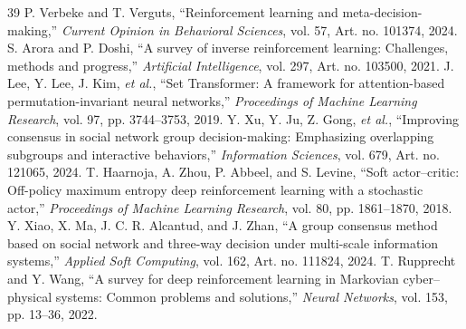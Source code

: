 \documentclass[journal]{IEEEtran}
\begin{document}
\begin{thebibliography}{39}
 P. Verbeke and T. Verguts, ``Reinforcement learning and meta-decision-making,'' \emph{Current Opinion in Behavioral Sciences}, vol. 57, Art. no. 101374, 2024.
 S. Arora and P. Doshi, ``A survey of inverse reinforcement learning: Challenges, methods and progress,'' \emph{Artificial Intelligence}, vol. 297, Art. no. 103500, 2021.
 J. Lee, Y. Lee, J. Kim, \emph{et al.}, ``Set Transformer: A framework for attention-based permutation-invariant neural networks,'' \emph{Proceedings of Machine Learning Research}, vol. 97, pp. 3744--3753, 2019.
 Y. Xu, Y. Ju, Z. Gong, \emph{et al.}, ``Improving consensus in social network group decision-making: Emphasizing overlapping subgroups and interactive behaviors,'' \emph{Information Sciences}, vol. 679, Art. no. 121065, 2024.
 T. Haarnoja, A. Zhou, P. Abbeel, and S. Levine, ``Soft actor--critic: Off-policy maximum entropy deep reinforcement learning with a stochastic actor,'' \emph{Proceedings of Machine Learning Research}, vol. 80, pp. 1861--1870, 2018.
 Y. Xiao, X. Ma, J. C. R. Alcantud, and J. Zhan, ``A group consensus method based on social network and three-way decision under multi-scale information systems,'' \emph{Applied Soft Computing}, vol. 162, Art. no. 111824, 2024.
 T. Rupprecht and Y. Wang, ``A survey for deep reinforcement learning in Markovian cyber--physical systems: Common problems and solutions,'' \emph{Neural Networks}, vol. 153, pp. 13--36, 2022.

\end{thebibliography}
\end{document}
